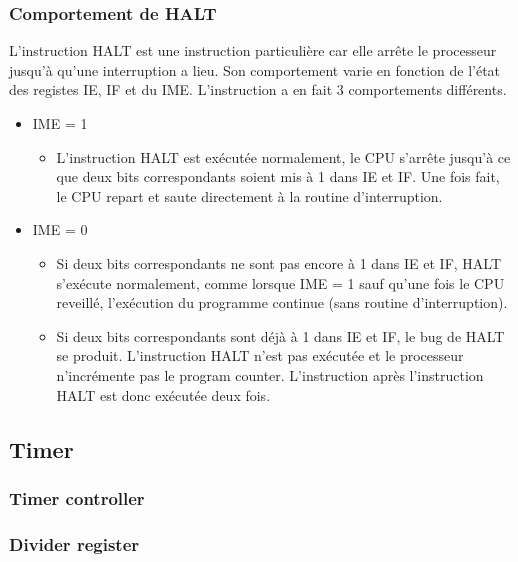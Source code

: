 \documentclass[a4paper]{article}
\begin{document}
\subsubsection{Comportement de HALT}
L'instruction HALT est une instruction particulière car elle arrête le processeur
jusqu'à qu'une interruption a lieu. Son comportement varie en fonction de l'état
des registes IE, IF et du IME. L'instruction a en fait 3 comportements
différents.
\begin{itemize}[label=\textbullet]
	\item IME = 1
	\begin{itemize}[label=\textbullet]
		\item L'instruction HALT est exécutée normalement, le CPU s'arrête jusqu'à
		ce que deux bits correspondants soient mis à 1 dans IE et IF. Une fois fait,
		le CPU repart et saute directement à la routine d'interruption.
	\end{itemize}
	\item IME = 0
	\begin{itemize}[label=\textbullet]
		\item Si deux bits correspondants ne sont pas encore à 1 dans IE et IF, HALT 
		s'exécute normalement, comme lorsque IME = 1 sauf qu'une fois le CPU reveillé,
		l'exécution du programme continue (sans routine d'interruption).
		\item Si deux bits correspondants sont déjà à 1 dans IE et IF, le bug de HALT
		se produit. L'instruction HALT n'est pas exécutée et le processeur n'incrémente
		pas le program counter. L'instruction après l'instruction HALT est donc exécutée
		deux fois.
	\end{itemize}
\end{itemize}


\subsection{Timer}
\subsubsection{Timer controller}

\subsubsection{Divider register}


\end{document}
